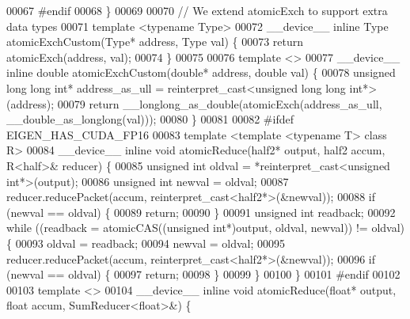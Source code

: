 \begin{DoxyCode}
00067 \textcolor{preprocessor}{#endif}
00068 \}
00069 
00070 \textcolor{comment}{// We extend atomicExch to support extra data types}
00071 \textcolor{keyword}{template} <\textcolor{keyword}{typename} Type>
00072 \_\_device\_\_ \textcolor{keyword}{inline} Type atomicExchCustom(Type* address, Type val) \{
00073   \textcolor{keywordflow}{return} atomicExch(address, val);
00074 \}
00075 
00076 \textcolor{keyword}{template} <>
00077 \_\_device\_\_ \textcolor{keyword}{inline} \textcolor{keywordtype}{double} atomicExchCustom(\textcolor{keywordtype}{double}* address, \textcolor{keywordtype}{double} val) \{
00078   \textcolor{keywordtype}{unsigned} \textcolor{keywordtype}{long} \textcolor{keywordtype}{long} \textcolor{keywordtype}{int}* address\_as\_ull = \textcolor{keyword}{reinterpret\_cast<}\textcolor{keywordtype}{unsigned} \textcolor{keywordtype}{long} \textcolor{keywordtype}{long} \textcolor{keywordtype}{int}*\textcolor{keyword}{>}(address);
00079   \textcolor{keywordflow}{return} \_\_longlong\_as\_double(atomicExch(address\_as\_ull, \_\_double\_as\_longlong(val)));
00080 \}
00081 
00082 \textcolor{preprocessor}{#ifdef EIGEN\_HAS\_CUDA\_FP16}
00083 \textcolor{keyword}{template} <\textcolor{keyword}{template} <\textcolor{keyword}{typename} T> \textcolor{keyword}{class }R>
00084 \_\_device\_\_ \textcolor{keyword}{inline} \textcolor{keywordtype}{void} atomicReduce(half2* output, half2 accum, R<half>& reducer) \{
00085   \textcolor{keywordtype}{unsigned} \textcolor{keywordtype}{int} oldval = *\textcolor{keyword}{reinterpret\_cast<}\textcolor{keywordtype}{unsigned} \textcolor{keywordtype}{int}*\textcolor{keyword}{>}(output);
00086   \textcolor{keywordtype}{unsigned} \textcolor{keywordtype}{int} newval = oldval;
00087   reducer.reducePacket(accum, reinterpret\_cast<half2*>(&newval));
00088   \textcolor{keywordflow}{if} (newval == oldval) \{
00089     \textcolor{keywordflow}{return};
00090   \}
00091   \textcolor{keywordtype}{unsigned} \textcolor{keywordtype}{int} readback;
00092   \textcolor{keywordflow}{while} ((readback = atomicCAS((\textcolor{keywordtype}{unsigned} \textcolor{keywordtype}{int}*)output, oldval, newval)) != oldval) \{
00093     oldval = readback;
00094     newval = oldval;
00095     reducer.reducePacket(accum, reinterpret\_cast<half2*>(&newval));
00096     \textcolor{keywordflow}{if} (newval == oldval) \{
00097       \textcolor{keywordflow}{return};
00098     \}
00099   \}
00100 \}
00101 \textcolor{preprocessor}{#endif}
00102 
00103 \textcolor{keyword}{template} <>
00104 \_\_device\_\_ \textcolor{keyword}{inline} \textcolor{keywordtype}{void} atomicReduce(\textcolor{keywordtype}{float}* output, \textcolor{keywordtype}{float} accum, SumReducer<float>&) \{

\end{DoxyCode}
